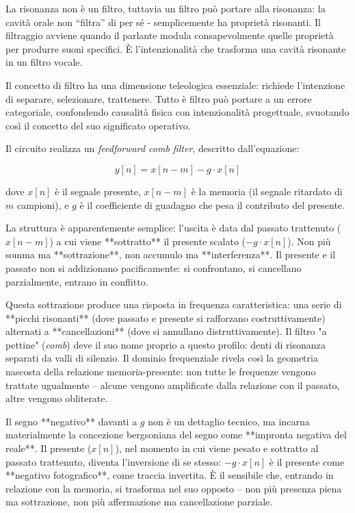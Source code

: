 La risonanza non è un filtro, tuttavia un filtro può portare alla risonanza: la
cavità orale non “filtra” di per sé - semplicemente ha proprietà risonanti. Il
filtraggio avviene quando il parlante modula consapevolmente quelle proprietà
per produrre suoni specifici. È l'intenzionalità che trasforma una cavità
risonante in un filtro vocale.

Il concetto di filtro ha una dimensione teleologica essenziale: richiede
l'intenzione di separare, selezionare, trattenere. Tutto è filtro può portare a
un errore categoriale, confondendo causalità fisica con intenzionalità
progettuale, svuotando così il concetto del suo significato operativo.




Il circuito realizza un \emph{feedforward comb filter}, descritto dall'equazione:

\begin{equation}
y[n] = x[n-m] - g \cdot x[n]
\end{equation}

dove $x[n]$ è il segnale presente, $x[n-m]$ è la memoria (il segnale ritardato di $m$ campioni), e $g$ è il coefficiente di guadagno che pesa il contributo del presente.

La struttura è apparentemente semplice: l'uscita è data dal passato trattenuto ($x[n-m]$) a cui viene **sottratto** il presente scalato ($-g \cdot x[n]$). Non più somma ma **sottrazione**, non accumulo ma **interferenza**. Il presente e il passato non si addizionano pacificamente: si confrontano, si cancellano parzialmente, entrano in conflitto.

Questa sottrazione produce una risposta in frequenza caratteristica: una serie di **picchi risonanti** (dove passato e presente si rafforzano costruttivamente) alternati a **cancellazioni** (dove si annullano distruttivamente). Il filtro "a pettine" (\emph{comb}) deve il suo nome proprio a questo profilo: denti di risonanza separati da valli di silenzio. Il dominio frequenziale rivela così la geometria nascosta della relazione memoria-presente: non tutte le frequenze vengono trattate ugualmente – alcune vengono amplificate dalla relazione con il passato, altre vengono obliterate.

Il segno **negativo** davanti a $g$ non è un dettaglio tecnico, ma incarna materialmente la concezione bergsoniana del segno come **impronta negativa del reale**. Il presente ($x[n]$), nel momento in cui viene pesato e sottratto al passato trattenuto, diventa l'inversione di se stesso: $-g \cdot x[n]$ è il presente come **negativo fotografico**, come traccia invertita. È il sensibile che, entrando in relazione con la memoria, si trasforma nel suo opposto – non più presenza piena ma sottrazione, non più affermazione ma cancellazione parziale.

